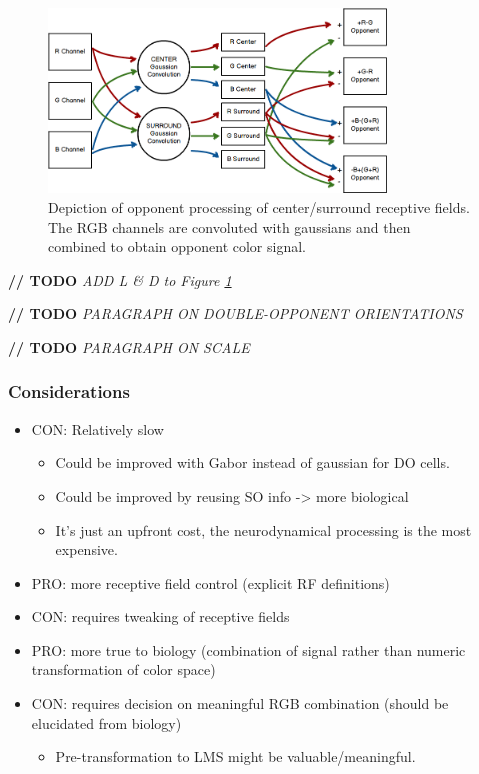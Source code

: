 \documentclass[journal,onecolumn]{IEEEtran}
\begin{document}
\begin{figure}[H]
    \centering
    \includegraphics[width=0.8\textwidth]{model2_mockup}
    \caption{Depiction of opponent processing of center/surround receptive fields. The RGB channels are convoluted with gaussians and then combined to obtain opponent color signal.}
    \label{fig:opponent-process}
\end{figure}

\textbf{// TODO} \textit{ADD L \& D to Figure \ref{fig:opponent-process}}

\textbf{// TODO} \textit{PARAGRAPH ON DOUBLE-OPPONENT ORIENTATIONS}

\textbf{// TODO} \textit{PARAGRAPH ON SCALE}

\subsubsection{Considerations}
\begin{itemize}
    \item CON: Relatively slow
    \begin{itemize}
        \item Could be improved with Gabor instead of gaussian for DO cells.
        \item Could be improved by reusing SO info -> more biological
        \item It's just an upfront cost, the neurodynamical processing is the most expensive.
    \end{itemize}
    \item PRO: more receptive field control (explicit RF definitions)
    \item CON: requires tweaking of receptive fields
    \item PRO: more true to biology (combination of signal rather than numeric transformation of color space)
    \item CON: requires decision on meaningful RGB combination (should be elucidated from biology)
    \begin{itemize}
        \item Pre-transformation to LMS might be valuable/meaningful.
    \end{itemize}
\end{itemize}
\end{document}
